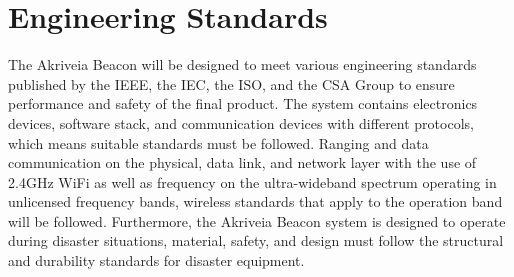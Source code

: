 
\setcounter{section}{2}
\section{Engineering Standards}
\bigskip

The Akriveia Beacon will be designed to meet various engineering standards published by the IEEE, the IEC, the ISO, and the CSA Group to ensure performance and safety of the final product. The system contains electronics devices, software stack, and communication devices with different protocols, which means suitable standards must be followed. Ranging and data communication on the physical, data link, and network layer with the use of 2.4GHz WiFi as well as frequency on the ultra-wideband spectrum operating in unlicensed frequency bands, wireless standards that apply to the operation band will be followed. Furthermore, the Akriveia Beacon system is designed to operate during disaster situations, material, safety, and design must follow the structural and durability standards for disaster equipment.


